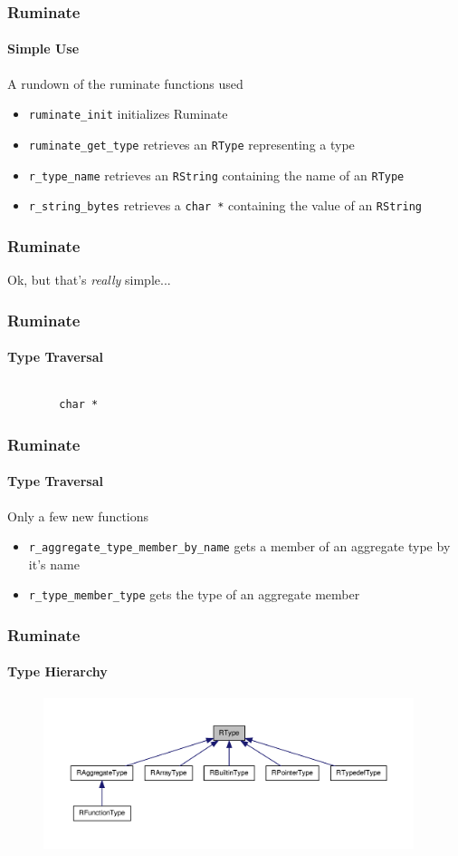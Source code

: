 \documentclass{beamer}
\begin{document}
\begin{frame}[fragile]
	\frametitle{Ruminate}
	\framesubtitle{Simple Use}

	A rundown of the ruminate functions used

	\begin{itemize}
		\item \lstinline|ruminate_init| initializes Ruminate
		\item \lstinline|ruminate_get_type| retrieves an \lstinline|RType| representing a
			type
		\item \lstinline|r_type_name| retrieves an \lstinline|RString| containing the
			name of an \lstinline|RType|
		\item \lstinline|r_string_bytes| retrieves a \lstinline|char *| containing the
			value of an \lstinline|RString|
	\end{itemize}
\end{frame}

\begin{frame}
	\frametitle{Ruminate}

	Ok, but that's \emph{really} simple...
\end{frame}

\begin{frame}
	\frametitle{Ruminate}
	\framesubtitle{Type Traversal}

	\inputminted[tabsize=4,linenos]{c}{ruminate_traverse.c}
	\pause
	\begin{verbatim}
		char *
	\end{verbatim}
\end{frame}

\begin{frame}[fragile]
	\frametitle{Ruminate}
	\framesubtitle{Type Traversal}

	Only a few new functions

	\begin{itemize}
		\item \lstinline|r_aggregate_type_member_by_name| gets a member of an
      aggregate type by it's name
		\item \lstinline|r_type_member_type| gets the type of an aggregate member
	\end{itemize}
\end{frame}

\begin{frame}
	\frametitle{Ruminate}
	\framesubtitle{Type Hierarchy}

	\begin{figure}
		\begin{center}
		\includegraphics[width=307pt]{struct_r_type__inherit__graph}
		\end{center}
	\end{figure}
\end{frame}
\end{document}
